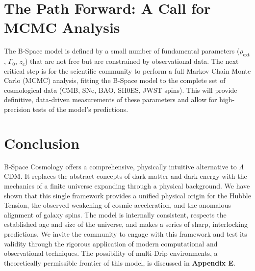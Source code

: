 \documentclass{BSpacePaper} %
\begin{document}
\section{The Path Forward: A Call for MCMC Analysis}
The B-Space model is defined by a small number of fundamental parameters ($\rho_{\text{ext}}$, $\Gamma_0$, $z_c$) that are not free but are constrained by observational data. The next critical step is for the scientific community to perform a full Markov Chain Monte Carlo (MCMC) analysis, fitting the B-Space model to the complete set of cosmological data (CMB, SNe, BAO, SH0ES, JWST spins). This will provide definitive, data-driven measurements of these parameters and allow for high-precision tests of the model's predictions.

\section{Conclusion}
B-Space Cosmology offers a comprehensive, physically intuitive alternative to \(\Lambda\)CDM. It replaces the abstract concepts of dark matter and dark energy with the mechanics of a finite universe expanding through a physical background. We have shown that this single framework provides a unified physical origin for the Hubble Tension, the observed weakening of cosmic acceleration, and the anomalous alignment of galaxy spins. The model is internally consistent, respects the established age and size of the universe, and makes a series of sharp, interlocking predictions. We invite the community to engage with this framework and test its validity through the rigorous application of modern computational and observational techniques. The possibility of multi-Drip environments, a theoretically permissible frontier of this model, is discussed in \textbf{Appendix E}.

\clearpage
\end{document}
